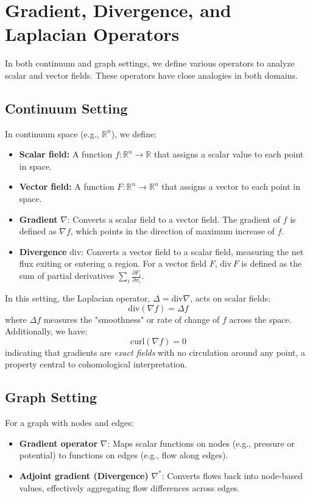 \documentclass[10pt,a4paper,twocolumn]{article}
\begin{document}
	
	
	\clearpage
	\section{Gradient, Divergence, and Laplacian Operators}
	In both continuum and graph settings, we define various operators to analyze scalar and vector fields. These operators have close analogies in both domains.
	
	\subsection{Continuum Setting}
	In continuum space (e.g., $\mathbb{R}^n$), we define:
	\begin{itemize}
		\item \textbf{Scalar field:} A function \( f \colon \mathbb{R}^n \rightarrow \mathbb{R} \) that assigns a scalar value to each point in space.
		\item \textbf{Vector field:} A function \( F \colon \mathbb{R}^n \rightarrow \mathbb{R}^n \) that assigns a vector to each point in space.
		\item \textbf{Gradient} \( \nabla \): Converts a scalar field to a vector field. The gradient of \( f \) is defined as \( \nabla f \), which points in the direction of maximum increase of \( f \).
		\item \textbf{Divergence} \( \text{div} \): Converts a vector field to a scalar field, measuring the net flux exiting or entering a region. For a vector field \( F \), \( \text{div} \, F \) is defined as the sum of partial derivatives \( \sum_{i} \frac{\partial F_i}{\partial x_i} \).
	\end{itemize}
	
	In this setting, the Laplacian operator, \( \Delta = \text{div} \nabla \), acts on scalar fields:
	\[
	\text{div}(\nabla f) = \Delta f
	\]
	where \( \Delta f \) measures the "smoothness" or rate of change of \( f \) across the space. Additionally, we have:
	\[
	\text{curl}(\nabla f) = 0
	\]
	indicating that gradients are \textit{exact fields} with no circulation around any point, a property central to cohomological interpretation.
	
	\subsection{Graph Setting}
	For a graph with nodes and edges:
	\begin{itemize}
		\item \textbf{Gradient operator} \( \nabla \): Maps scalar functions on nodes (e.g., pressure or potential) to functions on edges (e.g., flow along edges).
		\item \textbf{Adjoint gradient (Divergence)} \( \nabla^* \): Converts flows back into node-based values, effectively aggregating flow differences across edges.
	\end{itemize}
	
\end{document}
